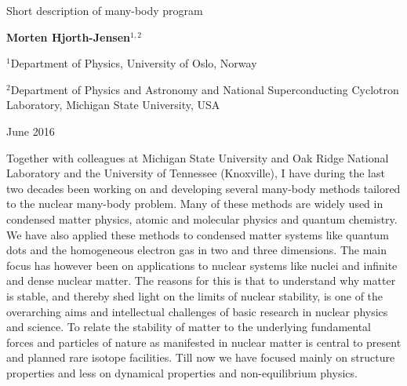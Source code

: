 \documentclass[%
oneside,                 %
final,                   %
10pt]{article}
\begin{document}

\newcommand{\exercisesection}[1]{\subsection*{#1}}






\thispagestyle{empty}

\begin{center}
{\LARGE\bf
\begin{spacing}{1.25}
Short description of many-body program
\end{spacing}
}
\end{center}


\begin{center}
{\bf Morten Hjorth-Jensen${}^{1, 2}$} \\ [0mm]
\end{center}

\begin{center}
\centerline{{\small ${}^1$Department of Physics, University of Oslo, Norway}}
\centerline{{\small ${}^2$Department of Physics and Astronomy and National Superconducting Cyclotron Laboratory, Michigan State University, USA}}
\end{center}
    

\begin{center}
June 2016
\end{center}

\vspace{1cm}


Together with colleagues at Michigan State University and Oak Ridge National Laboratory and the University of Tennessee (Knoxville), I have during the last two decades been working on and developing several many-body methods tailored to the nuclear many-body problem. Many of these methods are widely used in 
condensed matter physics, atomic and molecular physics and quantum chemistry. We have also applied these methods to condensed matter systems like quantum dots
and the homogeneous electron gas in two and three dimensions. 
The main focus has however been on applications to nuclear systems like nuclei and infinite and dense nuclear matter. The reasons for this is that 
to understand why matter is stable, and thereby shed light on the limits of nuclear stability, is one of the overarching aims and intellectual challenges of basic research in nuclear physics and science. To relate the stability of matter to the underlying fundamental forces and particles of nature as manifested in nuclear matter is central to present and planned rare isotope facilities.
Till now we have focused mainly on structure properties and less on dynamical properties and non-equilibrium physics.
\end{document}
